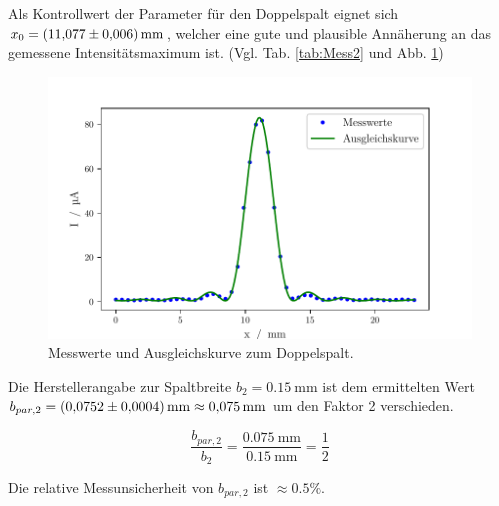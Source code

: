 Als Kontrollwert der Parameter für den Doppelspalt eignet sich $x_0 = \SI{11.077 \pm 0.006}{\milli\meter}$, welcher eine gute und plausible Annäherung an das gemessene Intensitätsmaximum ist. (Vgl. Tab. \ref{tab:Mess2} und Abb. \ref{fig:messDoppel})
\begin{figure}
    \centering
    \includegraphics[width=.9\textwidth]{python/DoppelspaltFit.pdf}
    \caption{Messwerte und Ausgleichskurve zum Doppelspalt.}
    \label{fig:messDoppel}
\end{figure}

Die Herstellerangabe zur Spaltbreite $b_2 = \SI{0.15}{\milli\meter}$ ist dem ermittelten Wert $b_{par, 2} = \SI{0.0752 \pm 0.0004}{\milli\meter} \approx \SI{0.075}{\milli\meter}$
um den Faktor 2 verschieden.

\begin{equation}
    \frac{b_{par, 2}}{b_2} = \frac{\SI{0.075}{\milli\meter}}{\SI{0.15}{\milli\meter}} = \frac{1}{2}
\end{equation}

Die relative Messunsicherheit von $b_{par, 2}$ ist $\approx 0.5\%$.